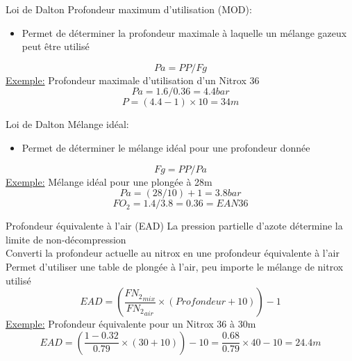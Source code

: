 \begin{frame}{Loi de Dalton}
	Profondeur maximum d'utilisation (MOD):
	\begin{itemize}
		\item Permet de déterminer la profondeur maximale à laquelle un mélange gazeux peut être utilisé
	\end{itemize}
	\[ \boxed{Pa = PP / Fg} \]
	\vfill
	\underline{Exemple:}	Profondeur maximale d'utilisation d'un Nitrox 36\\
	\[ Pa = 1.6 / 0.36 = 4.4 bar \]
	\[ P = (4.4 - 1) \times 10 = 34m \]	
\end{frame}

\begin{frame}{Loi de Dalton}
	Mélange idéal:
	\begin{itemize}
		\item Permet de déterminer le mélange idéal pour une profondeur donnée
	\end{itemize}
	 \[ \boxed{Fg = PP / Pa} \]
	\vfill
	\underline{Exemple:}	Mélange idéal pour une plongée à 28m\\
	\[	Pa = (28 / 10)+1 = 3.8 bar\]
	\[ FO_2 = 1.4 / 3.8 = 0.36 = EAN36 \]
\end{frame}

\begin{frame}{Profondeur équivalente à l'air (EAD)}
	La pression partielle d'azote détermine la limite de non-décompression\\
	Converti la profondeur actuelle au nitrox en une profondeur équivalente à l'air\\
	Permet d'utiliser une table de plongée à l'air, peu importe le mélange de nitrox utilisé\\

	\[	EAD = \left( \dfrac{ {FN_2}_{mix} }{ {FN_2}_{air} } \times (Profondeur+10) \right) -1 \]
	\vfill
	\underline{Exemple:} Profondeur équivalente pour un Nitrox 36 à 30m\\

	\[	EAD = \left( \dfrac{1-0.32}{0.79} \times (30+10) \right) -10 = \dfrac{0.68}{0.79} \times 40 - 10 = 24.4m \]
\end{frame}
